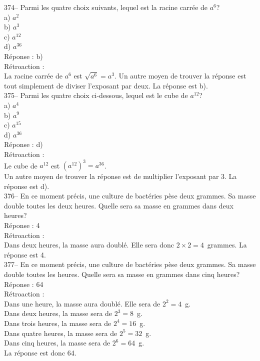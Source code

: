 ﻿\documentclass[letterpaper, 12pt]{article}
\begin{document}
374-- Parmi les quatre choix suivants, lequel est la racine carr\'ee de
$a^{6}$?\\
a) $a^{2}$\\
b) $a^{3}$\\
c) $a^{12}$\\
d) $a^{36}$\\

R\'eponse : b) \\

R\'etroaction : \\
La racine carr\'ee de $a^{6}$ est $ \sqrt{a^{6}}=a^{3}$.  Un autre moyen de
trouver la r\'eponse est tout simplement de diviser l'exposant par deux.  La
r\'eponse est b).\\

375-- Parmi les quatre choix ci-dessous, lequel est le cube de $a^{12}$?\\
a) $a^{4}$\\
b) $a^{9}$\\
c) $a^{15}$\\
d) $a^{36}$\\

R\'eponse : d) \\

R\'etroaction : \\
Le cube de $a^{12}$ est $\left( a^{12}\right)^{3}=a^{36}$.  \\
Un autre moyen de trouver la r\'eponse est de multiplier l'exposant par 3.
La r\'eponse est d).\\

376-- En ce moment pr\'ecis, une culture de bact\'eries p\`ese deux grammes.
  Sa masse double toutes les deux heures.  Quelle sera sa masse en grammes
dans deux heures?\\

R\'eponse : 4\\

R\'etroaction : \\
Dans deux heures, la masse aura doubl\'e.  Elle sera donc $2\times
2=4$~grammes.  La r\'eponse est 4.\\

377-- En ce moment pr\'ecis, une culture de bact\'eries p\`ese deux grammes.
  Sa masse double toutes les heures.  Quelle sera sa masse en grammes dans
cinq heures?\\

R\'eponse : 64\\

R\'etroaction : \\
Dans une heure, la masse aura doubl\'e.  Elle sera de $2^{2}=4$~g.\\
Dans deux heures, la masse sera de $2^{3}=8$~g.\\
Dans trois heures, la masse sera de $2^{4}=16$~g.\\
Dans quatre heures, la masse sera de $2^{5}=32$~g.\\
Dans cinq heures, la masse sera de $2^{6}=64$~g.\\
La r\'eponse est donc 64.\\
\end{document}
